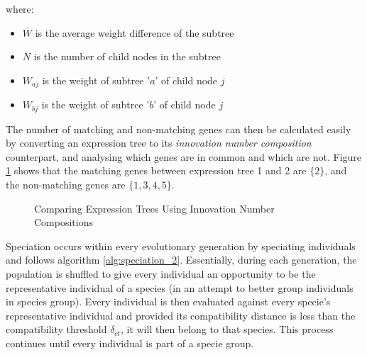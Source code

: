 \noindent where:
\begin{itemize}
	\item $\overline{W}$ is the average weight difference of the subtree
	\item $N$ is the number of child nodes in the subtree
	\item $W_{aj}$ is the weight of subtree '$a$' of child node $j$
	\item $W_{bj}$ is the weight of subtree '$b$' of child node $j$
\end{itemize} 

\noindent The number of matching and non-matching genes can then be calculated easily by converting an expression tree to its \textit{innovation number composition} counterpart, and analysing which genes are in common and which are not. Figure \ref{fig:gep_neat_innovation_number_compare} shows that the matching genes between expression tree 1 and 2 are $\{2\}$, and the non-matching genes are $\{1, 3, 4, 5\}$.

\begin{figure}[H] %
	\centering %
	\caption{Comparing Expression Trees Using Innovation Number Compositions}
	\label{fig:gep_neat_innovation_number_compare} %
\end{figure}

\noindent Speciation occurs within every evolutionary generation by speciating individuals and follows algorithm \ref{alg:speciation_2}. Essentially, during each generation, the population is shuffled to give every individual an opportunity to be the representative individual of a species (in an attempt to better group individuals in species group). Every individual is then evaluated against every specie's representative individual and provided its compatibility distance is less than the compatibility threshold $\delta_{ct}$, it will then belong to that species. This process continues until every individual is part of a specie group.

